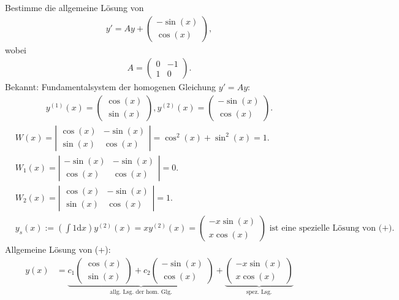 \documentclass[a4paper,oneside,DIV15,BCOR12mm,chapterprefix=true,headings=onelinechapter]{scrbook}
\begin{document}
\begin{beispiel}
Bestimme die allgemeine Lösung von
\begin{align*}
\tag{+}
y' = Ay + \begin{pmatrix} -\sin(x) \\ \cos(x) \end{pmatrix},
\end{align*}
wobei
\begin{align*}
A = \begin{pmatrix} 0 & -1 \\ 1 & 0 \end{pmatrix}.
\end{align*}
Bekannt: Fundamentalsystem der homogenen Gleichung $y' = Ay$:
\begin{align*}
y^{(1)}(x) = \begin{pmatrix} \cos(x) \\ \sin(x) \end{pmatrix}, y^{(2)}(x) = \begin{pmatrix} -\sin(x) \\ \cos(x) \end{pmatrix}.
\end{align*}
\begin{align*}
&W(x) = \left| \begin{array}{cc} \cos(x) & -\sin(x) \\ \sin(x) & \cos(x) \end{array} \right| = \cos^2(x) + \sin^2(x) = 1. \\
&W_1(x) = \left| \begin{array}{cc} -\sin(x) & -\sin(x) \\ \cos(x) & \cos(x) \end{array} \right| = 0. \\
&W_2(x) = \left| \begin{array}{cc} \cos(x) & -\sin(x) \\ \sin(x) & \cos(x) \end{array} \right| = 1. \\
&y_s(x) := \left( \int 1 \text{d}x \right) y^{(2)}(x) = xy^{(2)}(x) = \begin{pmatrix} -x \sin(x) \\ x \cos(x) \end{pmatrix} \text{ ist eine spezielle Lösung von (+).}
\end{align*}
Allgemeine Lösung von (+):
\begin{align*}
y(x) &= \underbrace{c_1 \begin{pmatrix} \cos(x) \\ \sin(x) \end{pmatrix} + c_2 \begin{pmatrix} -\sin(x) \\ \cos(x) \end{pmatrix}}_{\text{allg. Lsg. der hom. Glg.}} + \underbrace{\begin{pmatrix} -x \sin(x) \\ x \cos(x) \end{pmatrix}}_{\text{spez. Lsg.}} \\

\end{align*}
\end{beispiel}
\end{document}
